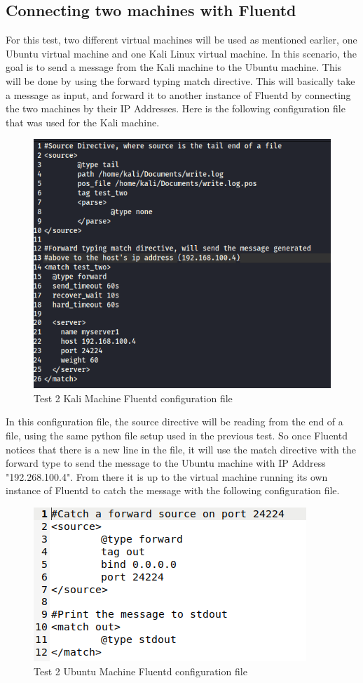 \subsection{Connecting two machines with Fluentd}
\quad \quad For this test, two different virtual machines will be used as mentioned earlier, one Ubuntu virtual machine and one Kali Linux virtual machine. In this scenario, the goal is to send a message from the Kali machine to the Ubuntu machine. This will be done
by using the forward typing match directive. This will basically take a message as input, and forward it to another instance of Fluentd by connecting the two machines by their IP Addresses. Here is the following configuration file that was used for the Kali machine.
\begin{figure}[H]
    \centering
    \includegraphics[scale=0.75]{images/t2_1.png}
    \caption{Test 2 Kali Machine Fluentd configuration file}
    \label{fig:pic7}
\end{figure}
In this configuration file, the source directive will be reading from the end of a file, using the same python file setup used in the previous test. So once Fluentd notices that there is a new line in the file, it will
use the match directive with the forward type to send the message to the Ubuntu machine with IP Address "192.268.100.4". From there it is up to the virtual machine running its own instance of Fluentd to catch the message with the following configuration file.
\begin{figure}[H]
    \centering
    \includegraphics[scale=1]{images/t2_2.png}
    \caption{Test 2 Ubuntu Machine Fluentd configuration file}
    \label{fig:pic8}
\end{figure}
